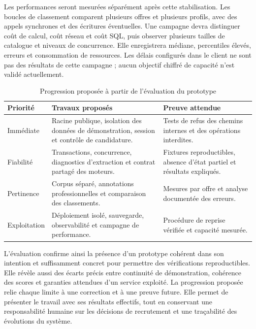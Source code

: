 Les performances seront mesurées séparément après cette stabilisation. Les boucles de classement comparent plusieurs offres et plusieurs profils, avec des appels synchrones et des écritures éventuelles. Une campagne devra distinguer coût de calcul, coût réseau et coût SQL, puis observer plusieurs tailles de catalogue et niveaux de concurrence. Elle enregistrera médiane, percentiles élevés, erreurs et consommation de ressources. Les délais configurés dans le client ne sont pas des résultats de cette campagne ; aucun objectif chiffré de capacité n'est validé actuellement.

\begin{table}[htbp]
\centering
\small
\caption{Progression proposée à partir de l'évaluation du prototype}
\label{tab:validation-roadmap}
\begin{tabularx}{\textwidth}{@{}P{0.16\textwidth}XX@{}}
\toprule
Priorité & Travaux proposés & Preuve attendue \\
\midrule
Immédiate & Racine publique, isolation des données de démonstration, session et contrôle de candidature. & Tests de refus des chemins internes et des opérations interdites. \\
Fiabilité & Transactions, concurrence, diagnostics d'extraction et contrat partagé des moteurs. & Fixtures reproductibles, absence d'état partiel et résultats expliqués. \\
Pertinence & Corpus séparé, annotations professionnelles et comparaison des classements. & Mesures par offre et analyse documentée des erreurs. \\
Exploitation & Déploiement isolé, sauvegarde, observabilité et campagne de performance. & Procédure de reprise vérifiée et capacité mesurée. \\
\bottomrule
\end{tabularx}
\end{table}

L'évaluation confirme ainsi la présence d'un prototype cohérent dans son intention et suffisamment concret pour permettre des vérifications reproductibles. Elle révèle aussi des écarts précis entre continuité de démonstration, cohérence des scores et garanties attendues d'un service exploité. La progression proposée relie chaque limite à une correction et à une preuve future. Elle permet de présenter le travail avec ses résultats effectifs, tout en conservant une responsabilité humaine sur les décisions de recrutement et une traçabilité des évolutions du système.
